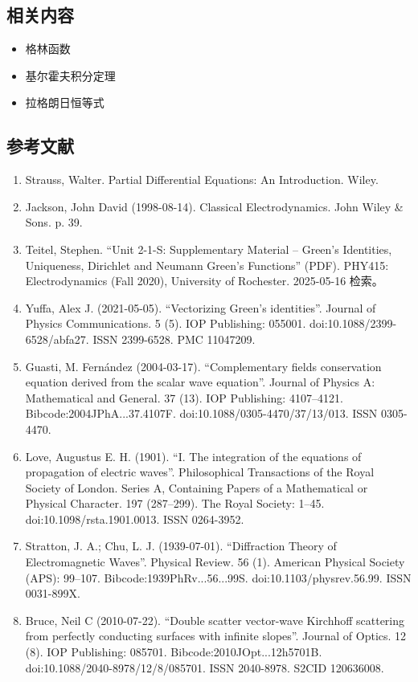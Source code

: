 \subsection{相关内容}
\begin{itemize}
\item 格林函数
\item 基尔霍夫积分定理
\item 拉格朗日恒等式
\end{itemize}
\subsection{参考文献}
\begin{enumerate}
\item Strauss, Walter. Partial Differential Equations: An Introduction. Wiley.
\item Jackson, John David (1998-08-14). Classical Electrodynamics. John Wiley & Sons. p. 39.
\item Teitel, Stephen. “Unit 2-1-S: Supplementary Material – Green's Identities, Uniqueness, Dirichlet and Neumann Green's Functions” (PDF). PHY415: Electrodynamics (Fall 2020), University of Rochester. 2025-05-16 检索。
\item Yuffa, Alex J. (2021-05-05). “Vectorizing Green's identities”. Journal of Physics Communications. 5 (5). IOP Publishing: 055001. doi:10.1088/2399-6528/abfa27. ISSN 2399-6528. PMC 11047209.
\item Guasti, M. Fernández (2004-03-17). “Complementary fields conservation equation derived from the scalar wave equation”. Journal of Physics A: Mathematical and General. 37 (13). IOP Publishing: 4107–4121. Bibcode:2004JPhA...37.4107F. doi:10.1088/0305-4470/37/13/013. ISSN 0305-4470.
\item Love, Augustus E. H. (1901). “I. The integration of the equations of propagation of electric waves”. Philosophical Transactions of the Royal Society of London. Series A, Containing Papers of a Mathematical or Physical Character. 197 (287–299). The Royal Society: 1–45. doi:10.1098/rsta.1901.0013. ISSN 0264-3952.
\item Stratton, J. A.; Chu, L. J. (1939-07-01). “Diffraction Theory of Electromagnetic Waves”. Physical Review. 56 (1). American Physical Society (APS): 99–107. Bibcode:1939PhRv...56...99S. doi:10.1103/physrev.56.99. ISSN 0031-899X.
\item Bruce, Neil C (2010-07-22). “Double scatter vector-wave Kirchhoff scattering from perfectly conducting surfaces with infinite slopes”. Journal of Optics. 12 (8). IOP Publishing: 085701. Bibcode:2010JOpt...12h5701B. doi:10.1088/2040-8978/12/8/085701. ISSN 2040-8978. S2CID 120636008.

\end{enumerate}
